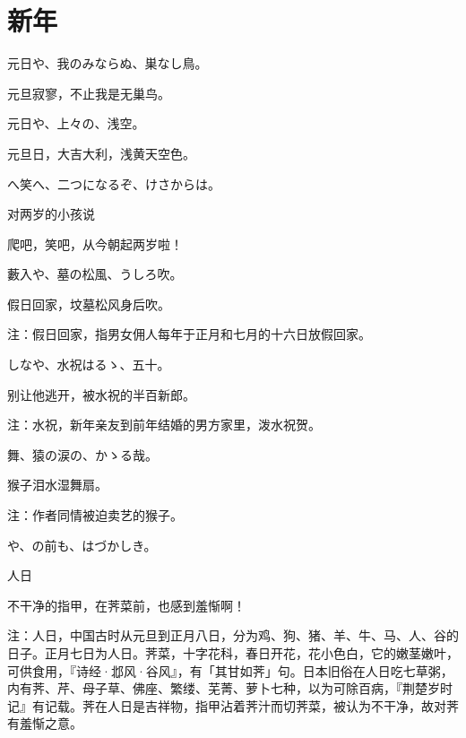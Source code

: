 \newpage

\section{\FK 新年}

\setcounter{haikucounter}{0}

\begin{haiku}
    {\FH 元日や、我のみならぬ、巣なし鳥。}

    {\FK 元旦寂寥，不止我是无巢鸟。}
\end{haiku}

\begin{haiku}
    {\FH 元日や、上々の、浅空。}

    {\FK 元旦日，大吉大利，浅黄天空色。}
\end{haiku}

\begin{haiku}
    {\FH {}へ笑へ、二つになるぞ、けさからは。}

    {\FK 对两岁的小孩说}

    {\FK 爬吧，笑吧，从今朝起两岁啦！}
\end{haiku}

\begin{haiku}
    {\FH 藪入や、墓の松風、うしろ吹。}

    {\FK 假日回家，坟墓松风身后吹。}

    {\FT 注：假日回家，指男女佣人每年于正月和七月的十六日放假回家。}
\end{haiku}

\begin{haiku}
    {\FH {}しなや、水祝はるゝ、五十。}

    {\FK 别让他逃开，被水祝的半百新郎。}

    {\FT 注：水祝，新年亲友到前年结婚的男方家里，泼水祝贺。}
\end{haiku}

\begin{haiku}
    {\FH 舞、猿の涙の、かゝる哉。}

    {\FK 猴子泪水湿舞扇。}

    {\FT 注：作者同情被迫卖艺的猴子。}
\end{haiku}

\begin{haiku}
    {\FH {}や、の前も、はづかしき。}

    {\FK 人日}

    {\FK 不干净的指甲，在荠菜前，也感到羞惭啊！}

    {\FT 注：人日，中国古时从元旦到正月八日，分为鸡、狗、猪、羊、牛、马、人、谷的日子。正月七日为人日。荠菜，十字花科，春日开花，花小色白，它的嫩茎嫩叶，可供食用，『诗经·邶风·谷风』，有「其甘如荠」句。日本旧俗在人日吃七草粥，内有荠、芹、母子草、佛座、繁缕、芜菁、萝卜七种，以为可除百病，『荆楚岁时记』有记载。荠在人日是吉祥物，指甲沾着荠汁而切荠菜，被认为不干净，故对荠有羞惭之意。}
\end{haiku}

